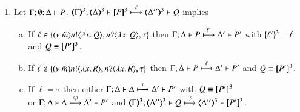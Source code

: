 \begin{proposition}
\begin{enumerate}
		\item	Let $\Gamma; \emptyset; \Delta \vdash P$.
			$\horel{\tmap{\Gamma}{3}}{\tmap{\Delta}{3}}{\pmap{P}{3}}{\hby{\ell}}
			{\tmap{\Delta''}{3}}{Q}$ implies
%
			\begin{enumerate}[a)]
				\item	If $\ell \in \{(\nu\ \tilde{m}) n ! \langle \lambda x.\,Q \rangle, n ? \langle \lambda x.\,Q \rangle, \tau\}$
					then
					$\Gamma; \Delta \vdash P \stackrel{\ell'}{\longmapsto} \Delta' \vdash P'$
					with $\{\!\!\{\ell'\}\!\!\}^{3} = \ell$ and $Q \equiv [\!\![P']\!\!]^{3}$.

				\item	If $\ell \notin \{(\nu\ \tilde{m}) n ! \langle \lambda x.\,R \rangle, n ? \langle \lambda x.\,R \rangle, \tau\}$
					then
					$\Gamma; \Delta \vdash P \stackrel{\ell}{\longmapsto} \Delta' \vdash P'$ and $Q \equiv [\!\![P']\!\!]^{3}$.

				\item	If $\ell = \tau$ then
					either
					$\Gamma; \Delta \vdash \Delta \stackrel{\tau}{\longmapsto} \Delta' \vdash P'$ with $Q \equiv [\!\![P']\!\!]^{3}$\\
					or
					$\Gamma; \Delta \vdash \Delta \stackrel{\tau_{\beta}}{\longmapsto} \Delta' \vdash P'$ and
					$\horel{\tmap{\Gamma}{3}}{\tmap{\Delta''}{3}}{Q}{\hby{\btau}}
					{\tmap{\Delta''}{3}}{\pmap{P'}{3}}$.
			\end{enumerate}
	\end{enumerate}
\end{proposition}

